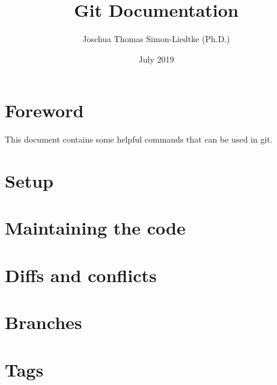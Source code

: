 \documentclass{report}
\title{Git Documentation}
\author{Joschua Thomas Simon-Liedtke (Ph.D.)}
\date{July 2019}
\begin{document}
\maketitle

\chapter*{Foreword}

This document contains some helpful commands that can be used in git.

\tableofcontents

\chapter{Setup}



\chapter{Maintaining the code}



\chapter{Diffs and conflicts}



\chapter{Branches}



\chapter{Tags}


\end{document}
